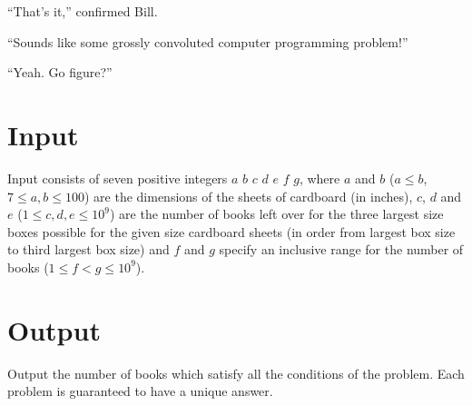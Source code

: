 ``That's it,'' confirmed Bill.

``Sounds like some grossly convoluted computer programming problem!''

``Yeah. Go figure?''

\section*{Input}
Input consists of seven positive integers $a$ $b$ $c$ $d$ $e$ $f$ $g$, where $a$ and $b$ ($a \leq b$, $7 \leq a,b \leq 100$) are the dimensions of the sheets of cardboard (in inches), $c$, $d$ and $e$ ($1 \leq c,d,e \leq 10^9$) are the number of books left over for the three largest size boxes possible for the given size cardboard sheets (in order from largest box size to third largest box size) and $f$ and $g$ specify an inclusive range for the number of books ($1 \leq f < g \leq 10^9$).

\section*{Output}
Output the number of books which satisfy all the conditions of the problem. Each problem is guaranteed to have a unique answer.


